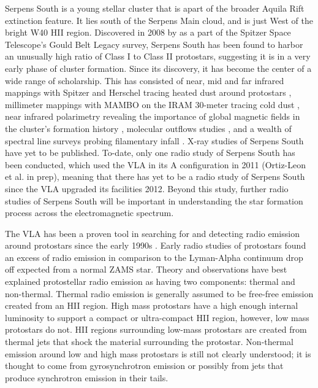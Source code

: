\documentclass[apj]{emulateapj}
\begin{document}
	Serpens South is a young stellar cluster that is apart of the broader Aquila Rift extinction feature. It lies south of the Serpens Main cloud, and is just West of the bright W40 HII region. Discovered in 2008 by \citet{Gutermuth08} as a part of the Spitzer Space Telescope's Gould Belt Legacy survey, Serpens South has been found to harbor an unusually high ratio of Class I to Class II protostars, suggesting it is in a very early phase of cluster formation. Since its discovery, it has become the center of a wide range of scholarship. This has consisted of near, mid and far infrared mappings with Spitzer and Herschel tracing heated dust around protostars \citep{Gutermuth08, Bontemps10}, millimeter mappings with MAMBO on the IRAM 30-meter tracing cold dust \citep{Maury11}, near infrared polarimetry revealing the importance of global magnetic fields in the cluster's formation history \citep{Sugitani11}, molecular outflows studies \citep{Nakamura11, Teixeira12}, and a wealth of spectral line surveys probing filamentary infall \citep{Kirk13, Friesen13, Tanaka13, FernandezLopez14,Nakamura14a}. X-ray studies of Serpens South have yet to be published. To-date, only one radio study of Serpens South has been conducted, which used the VLA in its A configuration in 2011 (Ortiz-Leon et al. in prep), meaning that there has yet to be a radio study of Serpens South since the VLA upgraded its facilities 2012. Beyond this study, further radio studies of Serpens South will be important in understanding the star formation process across the electromagnetic spectrum. 
	 
	 
	The VLA has been a proven tool in searching for and detecting radio emission around protostars since the early 1990s \citep[e.g.][]{Curiel89, Anglada98, Reipurth99, Eiroa05, Shirley07, Rodriguez10}. Early radio studies of protostars found an excess of radio emission in comparison to the Lyman-Alpha continuum drop off expected from a normal ZAMS star. Theory and observations have best explained protostellar radio emission as having two components: thermal and non-thermal. Thermal radio emission is generally assumed to be free-free emission created from an HII region. High mass protostars have a high enough internal luminosity to support a compact or ultra-compact HII region, however, low mass protostars do not. HII regions surrounding low-mass protostars are created from thermal jets that shock the material surrounding the protostar. Non-thermal emission around low and high mass protostars is still not clearly understood; it is thought to come from gyrosynchrotron emission or possibly from jets that produce synchrotron emission in their tails. 
	
\end{document}
